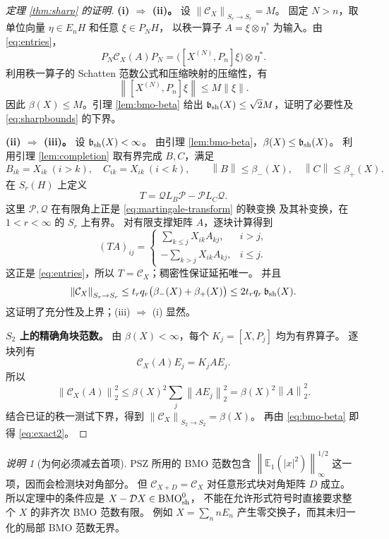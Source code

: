 \documentclass[UTF8,11pt,a4paper,fontset=fandol]{ctexart}
\theoremstyle{remark}
\newtheorem{remark}[theorem]{说明}
\newcommand{\PP}{\mathcal P}
\newcommand{\QQ}{\mathcal Q}
\newcommand{\DD}{\mathcal D}
\newcommand{\CC}{\mathcal C}
\newcommand{\norm}[1]{\left\lVert #1\right\rVert}
\numberwithin{equation}{section}
\begin{document}
\begin{proof}[定理 \ref{thm:sharp} 的证明]
\textbf{\textup{(i)} $\Rightarrow$ \textup{(ii)}。}
设 $\norm{\CC_X}_{S_r\to S_r}=M$。
固定 $N>n$，取单位向量 $\eta\in E_nH$ 和任意 $\xi\in P_NH$，
以秩一算子 $A=\xi\otimes\eta^*$ 为输入。由 \eqref{eq:entries}，
\[
 P_N\CC_X(A)P_N
 =\bigl([X^{(N)},P_n]\xi\bigr)\otimes\eta^*.
\]
利用秩一算子的 Schatten 范数公式和压缩映射的压缩性，有
\[
 \norm{[X^{(N)},P_n]\xi}\leq M\norm\xi.
\]
因此 $\beta(X)\leq M$。引理 \ref{lem:bmo-beta} 给出
$\mathfrak b_{\rm sh}(X)\leq\sqrt2 M$，证明了必要性及
\eqref{eq:sharpbounds} 的下界。

\medskip
\textbf{\textup{(ii)} $\Rightarrow$ \textup{(iii)}。}
设 $\mathfrak b_{\rm sh}(X)<\infty$。
由引理 \ref{lem:bmo-beta}，$\beta(X)\leq\mathfrak b_{\rm sh}(X)$。
利用引理 \ref{lem:completion} 取有界完成 $B,C$，满足
\[
 B_{ik}=X_{ik}\ (i>k),\quad C_{ik}=X_{ik}\ (i<k),\qquad
 \norm B\leq\beta_-(X),\quad\norm C\leq\beta_+(X).
\]
在 $S_r(H)$ 上定义
\begin{equation}\label{eq:factorization}
 T=\QQ L_B\PP-\PP L_C\QQ.
\end{equation}
这里 $\PP,\QQ$ 在有限角上正是 \eqref{eq:martingale-transform} 的鞅变换
及其补变换，在 $1<r<\infty$ 的 $S_r$ 上有界。
对有限支撑矩阵 $A$，逐块计算得到
\[
 (TA)_{ij}=\begin{cases}
   \displaystyle\sum_{k\leq j}X_{ik}A_{kj},&i>j,\\[4pt]
   \displaystyle-\sum_{k>j}X_{ik}A_{kj},&i\leq j.
 \end{cases}
\]
这正是 \eqref{eq:entries}，所以 $T=\CC_X$；稠密性保证延拓唯一。
并且
\[
 \norm{\CC_X}_{S_r\to S_r}
 \leq t_rq_r\bigl(\beta_-(X)+\beta_+(X)\bigr)
 \leq2t_rq_r\,\mathfrak b_{\rm sh}(X).
\]
这证明了充分性及上界；\textup{(iii)} $\Rightarrow$ \textup{(i)} 显然。

\medskip
\textbf{$S_2$ 上的精确角块范数。}
由 $\beta(X)<\infty$，每个 $K_j=[X,P_j]$ 均为有界算子。
逐块列有
\[
 \CC_X(A)E_j=K_jAE_j.
\]
所以
\[
 \norm{\CC_X(A)}_2^2
 \leq\beta(X)^2\sum_j\norm{AE_j}_2^2
 =\beta(X)^2\norm A_2^2.
\]
结合已证的秩一测试下界，得到
$\norm{\CC_X}_{S_2\to S_2}=\beta(X)$。
再由 \eqref{eq:bmo-beta} 即得 \eqref{eq:exact2}。
\end{proof}

\begin{remark}[为何必须减去首项]
PSZ 所用的 BMO 范数包含
$\norm{\mathbb E_1(|x|^2)}_\infty^{1/2}$ 这一项，因而会检测块对角部分。
但 $\CC_{X+D}=\CC_X$ 对任意形式块对角矩阵 $D$ 成立。
所以定理中的条件应是 $X-\DD X\in\mathrm{BMO}_{\rm sh}^{0}$，
不能在允许形式符号时直接要求整个 $X$ 的非齐次 BMO 范数有限。
例如 $X=\sum_n nE_n$ 产生零交换子，而其未归一化的局部 BMO 范数无界。
\end{remark}
\end{document}
